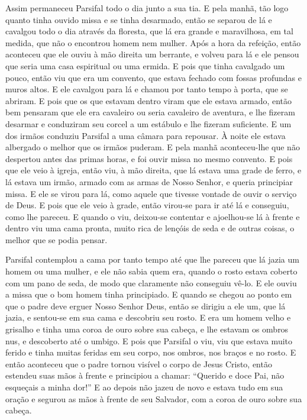 Assim permaneceu Parsifal todo o dia junto a sua tia. E pela manhã, tão
logo quanto tinha ouvido missa e se tinha desarmado, então se separou de lá e
cavalgou todo o dia através da floresta, que lá era grande e maravilhosa, em
tal medida, que não o encontrou homem nem mulher. Após a hora da refeição,
então aconteceu que ele ouviu à mão direita um berrante, e volveu para lá e ele
pensou que seria uma casa espiritual ou uma ermida. E pois que tinha cavalgado
um pouco, então viu que era um convento, que estava fechado com fossas
profundas e muros altos. E ele cavalgou para lá e chamou por tanto tempo à
porta, que se abriram. E pois que os que estavam dentro viram que ele estava
armado, então bem pensaram que ele era cavaleiro ou seria cavaleiro de
aventura, e lhe fizeram desarmar e conduziram seu corcel a um estábulo e lhe
fizeram suficiente. E um dos irmãos conduziu Parsifal a uma câmara para
repousar. À noite ele estava albergado o melhor que os irmãos puderam. E pela
manhã aconteceu-lhe que não despertou antes das primas horas, e foi ouvir missa
no mesmo convento. E pois que ele veio à igreja, então viu, à mão
direita, que lá estava uma grade de ferro, e lá estava um irmão, armado com as
armas de Nosso Senhor, e queria principiar missa. E ele se virou para lá, como
aquele que tivesse vontade de ouvir o serviço de Deus. E pois que ele veio à
grade, então virou-se para ir até lá e conseguiu, como lhe pareceu. E quando o
viu, deixou-se contentar e ajoelhou-se lá à frente e dentro viu uma cama
pronta, muito rica de lençóis de seda e de outras coisas, o melhor que se podia
pensar.

Parsifal contemplou a cama por tanto tempo até que lhe pareceu que lá jazia
um homem ou uma mulher, e ele não sabia quem era, quando o rosto estava coberto
com um pano de seda, de modo que claramente não conseguiu vê-lo. E ele ouviu a
missa que o bom homem tinha principiado. E quando se chegou ao ponto em que o
padre deve erguer Nosso Senhor Deus, então se dirigiu a ele um, que lá jazia, e
sentou-se em sua cama e descobriu seu rosto. E era um homem velho e grisalho e
tinha uma coroa de ouro sobre sua cabeça, e lhe estavam os ombros nus, e
descoberto até o umbigo. E pois que Parsifal o viu, viu que estava muito
ferido e tinha muitas feridas em seu corpo, nos ombros,  nos braços e no
rosto. E então aconteceu que o padre tornou visível o corpo de Jesus Cristo,
então estendeu suas mãos à frente e principiou a chamar: “Querido e doce Pai,
não esqueçais a minha dor!” E ao depois não jazeu de novo e estava tudo em sua
oração e segurou as mãos à frente de seu Salvador, com a coroa de ouro sobre
sua cabeça.


